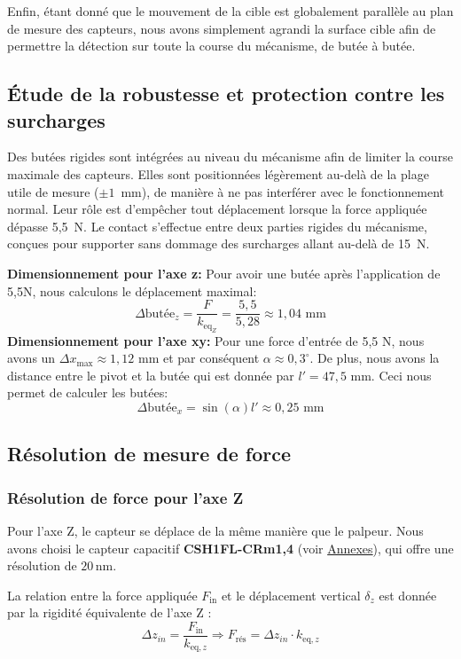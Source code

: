 \documentclass[a4paper, 11pt]{article} %
\begin{document}
Enfin, étant donné que le mouvement de la cible est globalement parallèle au plan de mesure des capteurs, nous avons simplement agrandi la surface cible afin de permettre la détection sur toute la course du mécanisme, de butée à butée.


\subsection{Étude de la robustesse et protection contre les surcharges}

Des butées rigides sont intégrées au niveau du mécanisme afin de limiter la course maximale des capteurs. Elles sont positionnées légèrement au-delà de la plage utile de mesure (\(\pm 1\)~mm), de manière à ne pas interférer avec le fonctionnement normal. Leur rôle est d'empêcher tout déplacement lorsque la force appliquée dépasse 5,5~N. Le contact s'effectue entre deux parties rigides du mécanisme, conçues pour supporter sans dommage des surcharges allant au-delà de 15~N.

\textbf{Dimensionnement pour l'axe z: }
Pour avoir une butée après l'application de 5,5N, nous calculons le déplacement maximal:
$$\Delta \text{butée}_z = \frac{F}{k_{\text{eq}_Z}}= \frac{5,5}{5,28} \approx 1,04\text{ mm}$$
\textbf{Dimensionnement pour l'axe xy: } Pour une force d'entrée de 5,5 N, nous avons un $\Delta x_\text{max} \approx 1,12$ mm et par conséquent $\alpha \approx 0,3^\circ $. De plus, nous avons la distance entre le pivot et la butée qui est donnée par $l' = 47,5$ mm. Ceci nous permet de calculer les butées:
$$\Delta \text{butée}_x = \sin(\alpha)l' \approx 0,25\text{ mm}$$

\subsection{Résolution de mesure de force}
\label{resolution_force}

\subsubsection*{Résolution de force pour l'axe Z}

Pour l'axe Z, le capteur se déplace de la même manière que le palpeur. Nous avons choisi le capteur capacitif \textbf{CSH1FL-CRm1,4} (voir \hyperref[Annexes]{Annexes}), qui offre une résolution de \(20\, \text{nm}\).

La relation entre la force appliquée \(F_{\text{in}}\) et le déplacement vertical \(\delta_z\) est donnée par la rigidité équivalente de l’axe Z :
\[
\Delta z_{in} = \frac{F_{\text{in}}}{k_{\text{eq},z}} \Rightarrow F_{\text{rés}} = \Delta z_{in} \cdot k_{\text{eq},z}
\]
\end{document}
